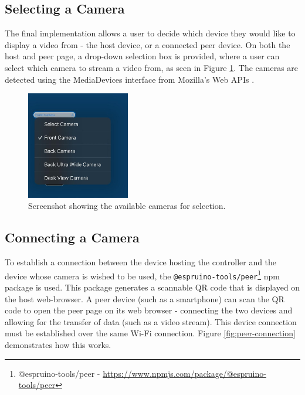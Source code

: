\documentclass{l4proj}
\begin{document}
\subsection{Selecting a Camera}
The final implementation allows a user to decide which device they would like to display a video from - the host device, or a connected peer device. On both the host and peer page, a drop-down selection box is provided, where a user can select which camera to stream a video from, as seen in Figure \ref{fig:camera-selection}. The cameras are detected using the MediaDevices interface from Mozilla's Web APIs \citep{mediadevices}.

\begin{figure}[!ht]
    \centering
    \includegraphics[width=0.4\textwidth]{images/camera-selection.jpeg}
    \caption{Screenshot showing the available cameras for selection.}
    \label{fig:camera-selection}
\end{figure}


\subsection{Connecting a Camera}
To establish a connection between the device hosting the controller and the device whose camera is wished to be used, the \lstinline{@espruino-tools/peer}\footnote{@espruino-tools/peer - \url{https://www.npmjs.com/package/@espruino-tools/peer}} npm package is used. This package generates a scannable QR code that is displayed on the host web-browser. A peer device (such as a smartphone) can scan the QR code to open the peer page on its web browser - connecting the two devices and allowing for the transfer of data (such as a video stream). This device connection must be established over the same Wi-Fi connection. Figure \ref{fig:peer-connection} demonstrates how this works.
\end{document}
